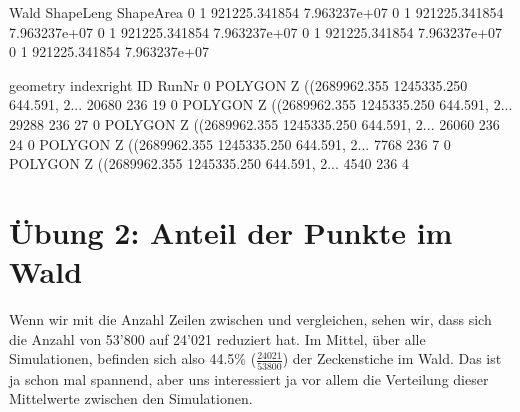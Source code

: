 \documentclass[letterpaper,10pt,english]{sphinxmanual}
\begin{document}
\begin{sphinxVerbatim}[commandchars=\\\{\}]
    
      

  

\end{sphinxVerbatim}

\begin{sphinxVerbatim}[commandchars=\\\{\}]
   Wald     Shape\PYGZus{}Leng    Shape\PYGZus{}Area  \PYGZbs{}
0     1  921225.341854  7.963237e+07   
0     1  921225.341854  7.963237e+07   
0     1  921225.341854  7.963237e+07   
0     1  921225.341854  7.963237e+07   
0     1  921225.341854  7.963237e+07   

                                            geometry  index\PYGZus{}right   ID  Run\PYGZus{}Nr  
0  POLYGON Z ((2689962.355 1245335.250 644.591, 2...        20680  236      19  
0  POLYGON Z ((2689962.355 1245335.250 644.591, 2...        29288  236      27  
0  POLYGON Z ((2689962.355 1245335.250 644.591, 2...        26060  236      24  
0  POLYGON Z ((2689962.355 1245335.250 644.591, 2...         7768  236       7  
0  POLYGON Z ((2689962.355 1245335.250 644.591, 2...         4540  236       4  
\end{sphinxVerbatim}


\section{Übung 2: Anteil der Punkte im Wald}
\label{\detokenize{03_04_Waldanteil_Berechnen:ubung-2-anteil-der-punkte-im-wald}}
Wenn wir mit  die Anzahl Zeilen zwischen  und  vergleichen, sehen wir, dass sich die Anzahl von 53’800 auf 24’021 reduziert hat. Im Mittel, über alle Simulationen, befinden sich also 44.5\%  (\(\frac{24021}{53800}\)) der Zeckenstiche im Wald. Das ist ja schon mal spannend, aber uns interessiert ja vor allem die Verteilung dieser Mittelwerte zwischen den Simulationen.
\end{document}
